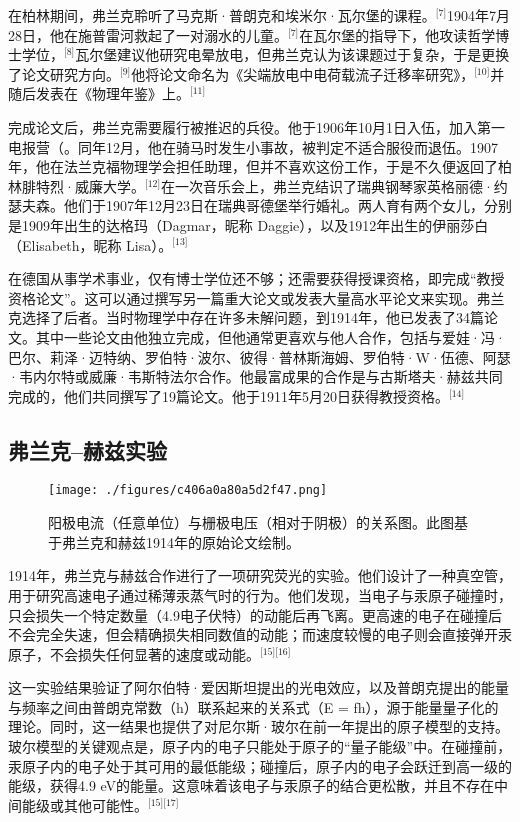 在柏林期间，弗兰克聆听了马克斯·普朗克和埃米尔·瓦尔堡的课程。\(^\text{[7]}\)1904年7月28日，他在施普雷河救起了一对溺水的儿童。\(^\text{[7]}\)在瓦尔堡的指导下，他攻读哲学博士学位，\(^\text{[8]}\)瓦尔堡建议他研究电晕放电，但弗兰克认为该课题过于复杂，于是更换了论文研究方向。\(^\text{[9]}\)他将论文命名为《尖端放电中电荷载流子迁移率研究》，\(^\text{[10]}\)并随后发表在《物理年鉴》上。\(^\text{[11]}\)

完成论文后，弗兰克需要履行被推迟的兵役。他于1906年10月1日入伍，加入第一电报营（。同年12月，他在骑马时发生小事故，被判定不适合服役而退伍。1907年，他在法兰克福物理学会担任助理，但并不喜欢这份工作，于是不久便返回了柏林腓特烈·威廉大学。\(^\text{[12]}\)在一次音乐会上，弗兰克结识了瑞典钢琴家英格丽德·约瑟夫森。他们于1907年12月23日在瑞典哥德堡举行婚礼。两人育有两个女儿，分别是1909年出生的达格玛（Dagmar，昵称 Daggie），以及1912年出生的伊丽莎白（Elisabeth，昵称 Lisa）。\(^\text{[13]}\)

在德国从事学术事业，仅有博士学位还不够；还需要获得授课资格，即完成“教授资格论文”。这可以通过撰写另一篇重大论文或发表大量高水平论文来实现。弗兰克选择了后者。当时物理学中存在许多未解问题，到1914年，他已发表了34篇论文。其中一些论文由他独立完成，但他通常更喜欢与他人合作，包括与爱娃·冯·巴尔、莉泽·迈特纳、罗伯特·波尔、彼得·普林斯海姆、罗伯特·W·伍德、阿瑟·韦内尔特或威廉·韦斯特法尔合作。他最富成果的合作是与古斯塔夫·赫兹共同完成的，他们共同撰写了19篇论文。他于1911年5月20日获得教授资格。\(^\text{[14]}\)
\subsection{弗兰克–赫兹实验}
\begin{figure}[ht]
\centering
\texttt{[image: ./figures/c406a0a80a5d2f47.png]}
\caption{阳极电流（任意单位）与栅极电压（相对于阴极）的关系图。此图基于弗兰克和赫兹1914年的原始论文绘制。} \label{fig_ZMSflk_1}
\end{figure}
1914年，弗兰克与赫兹合作进行了一项研究荧光的实验。他们设计了一种真空管，用于研究高速电子通过稀薄汞蒸气时的行为。他们发现，当电子与汞原子碰撞时，只会损失一个特定数量（4.9电子伏特）的动能后再飞离。更高速的电子在碰撞后不会完全失速，但会精确损失相同数值的动能；而速度较慢的电子则会直接弹开汞原子，不会损失任何显著的速度或动能。\(^\text{[15][16]}\)

这一实验结果验证了阿尔伯特·爱因斯坦提出的光电效应，以及普朗克提出的能量与频率之间由普朗克常数（h）联系起来的关系式（E = fh），源于能量量子化的理论。同时，这一结果也提供了对尼尔斯·玻尔在前一年提出的原子模型的支持。玻尔模型的关键观点是，原子内的电子只能处于原子的“量子能级”中。在碰撞前，汞原子内的电子处于其可用的最低能级；碰撞后，原子内的电子会跃迁到高一级的能级，获得4.9 eV的能量。这意味着该电子与汞原子的结合更松散，并且不存在中间能级或其他可能性。\(^\text{[15][17]}\)

